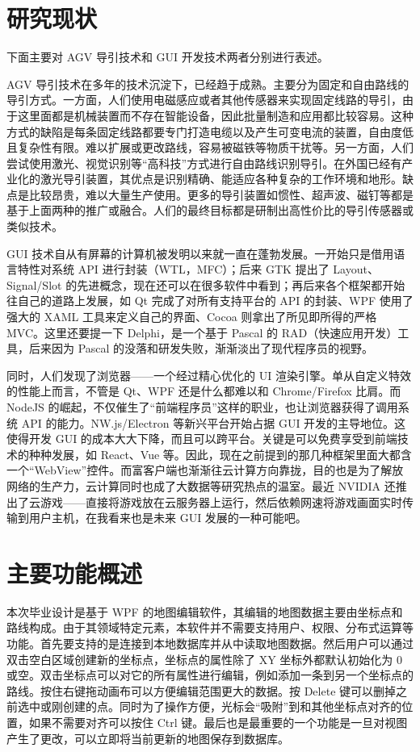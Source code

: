 \section{研究现状}

下面主要对 AGV 导引技术和 GUI 开发技术两者分别进行表述。

AGV 导引技术在多年的技术沉淀下，已经趋于成熟。主要分为固定和自由路线的导引方式。一方面，人们使用电磁感应或者其他传感器来实现固定线路的导引，由于这里面都是机械装置而不存在智能设备，因此批量制造和应用都比较容易。这种方式的缺陷是每条固定线路都要专门打造电缆以及产生可变电流的装置，自由度低且复杂性有限。难以扩展或更改路线，容易被磁铁等物质干扰等。另一方面，人们尝试使用激光、视觉识别等``高科技''方式进行自由路线识别导引。在外国已经有产业化的激光导引装置，其优点是识别精确、能适应各种复杂的工作环境和地形。缺点是比较昂贵，难以大量生产使用。更多的导引装置如惯性、超声波、磁钉等都是基于上面两种的推广或融合。人们的最终目标都是研制出高性价比的导引传感器或类似技术。

GUI 技术自从有屏幕的计算机被发明以来就一直在蓬勃发展。一开始只是借用语言特性对系统 API 进行封装（WTL，MFC）；后来 GTK 提出了 Layout、Signal/Slot 的先进概念，现在还可以在很多软件中看到；再后来各个框架都开始往自己的道路上发展，如 Qt 完成了对所有支持平台的 API 的封装、WPF 使用了强大的 XAML 工具来定义自己的界面、Cocoa 则拿出了所见即所得的严格 MVC。这里还要提一下 Delphi，是一个基于 Pascal 的 RAD（快速应用开发）工具，后来因为 Pascal 的没落和研发失败，渐渐淡出了现代程序员的视野。

同时，人们发现了浏览器——一个经过精心优化的 UI 渲染引擎。单从自定义特效的性能上而言，不管是 Qt、WPF 还是什么都难以和 Chrome/Firefox 比肩。而 NodeJS 的崛起，不仅催生了``前端程序员''这样的职业，也让浏览器获得了调用系统 API 的能力。NW.js/Electron 等新兴平台开始占据 GUI 开发的主导地位。这使得开发 GUI 的成本大大下降，而且可以跨平台。关键是可以免费享受到前端技术的种种发展，如 React、Vue 等。因此，现在之前提到的那几种框架里面大都含一个``WebView''控件。而富客户端也渐渐往云计算方向靠拢，目的也是为了解放网络的生产力，云计算同时也成了大数据等研究热点的温室。最近 NVIDIA 还推出了云游戏——直接将游戏放在云服务器上运行，然后依赖网速将游戏画面实时传输到用户主机，在我看来也是未来 GUI 发展的一种可能吧。

\section{主要功能概述}

本次毕业设计是基于 WPF 的地图编辑软件，其编辑的地图数据主要由坐标点和路线构成。由于其领域特定元素，本软件并不需要支持用户、权限、分布式运算等功能。首先要支持的是连接到本地数据库并从中读取地图数据。然后用户可以通过双击空白区域创建新的坐标点，坐标点的属性除了 XY 坐标外都默认初始化为 0 或空。双击坐标点可以对它的所有属性进行编辑，例如添加一条到另一个坐标点的路线。按住右键拖动画布可以方便编辑范围更大的数据。按 Delete 键可以删掉之前选中或刚创建的点。同时为了操作方便，光标会``吸附''到和其他坐标点对齐的位置，如果不需要对齐可以按住 Ctrl 键。最后也是最重要的一个功能是一旦对视图产生了更改，可以立即将当前更新的地图保存到数据库。

